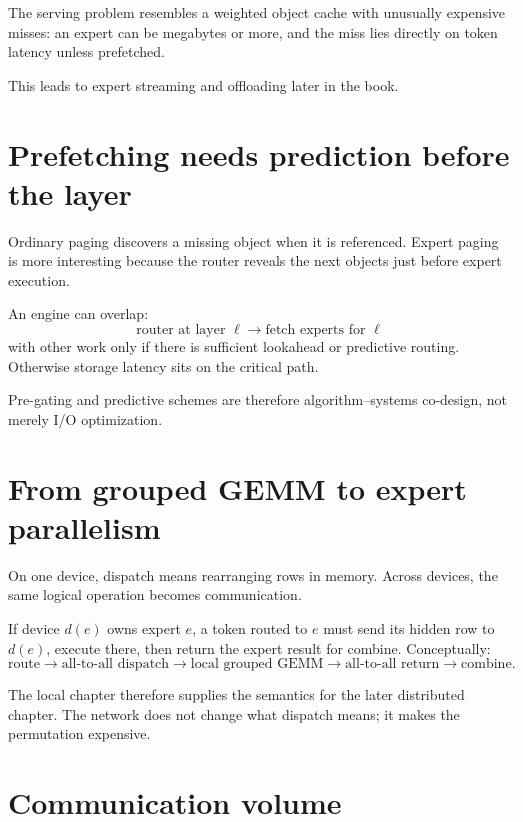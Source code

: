 The serving problem resembles a weighted object cache with unusually expensive misses:
an expert can be megabytes or more, and the miss lies directly on token latency unless
prefetched.

This leads to expert streaming and offloading later in the book.

\section{Prefetching needs prediction before the layer}

Ordinary paging discovers a missing object when it is referenced. Expert paging is more
interesting because the router reveals the next objects just before expert execution.

An engine can overlap:
\[
\text{router at layer }\ell
\rightarrow
\text{fetch experts for }\ell
\]
with other work only if there is sufficient lookahead or predictive routing. Otherwise
storage latency sits on the critical path.

Pre-gating and predictive schemes are therefore algorithm--systems co-design, not
merely I/O optimization.

\section{From grouped GEMM to expert parallelism}

On one device, dispatch means rearranging rows in memory. Across devices, the same
logical operation becomes communication.

If device $d(e)$ owns expert $e$, a token routed to $e$ must send its hidden row to
$d(e)$, execute there, then return the expert result for combine. Conceptually:
\[
\text{route}
\rightarrow
\text{all-to-all dispatch}
\rightarrow
\text{local grouped GEMM}
\rightarrow
\text{all-to-all return}
\rightarrow
\text{combine}.
\]

The local chapter therefore supplies the semantics for the later distributed chapter.
The network does not change what dispatch means; it makes the permutation expensive.


\section{Communication volume}

